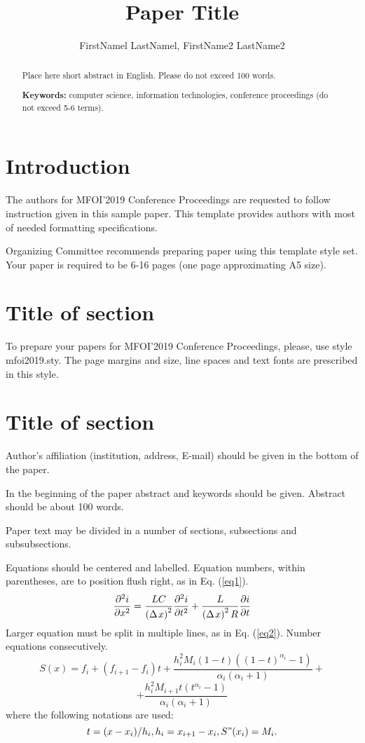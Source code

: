 \documentclass[11pt,twoside,a5paper]{article}
\title{Paper Title}
\author{FirstNamel LastNamel, FirstName2 LastName2}
\begin{document}
\maketitle

\begin{abstract}
Place here short abstract in English. Please do not exceed 100 words.

\textbf{Keywords:} computer science, information technologies, conference 
proceedings (do not exceed 5-6 terms).
\end{abstract}

\section{Introduction}
The authors for MFOI'2019 Conference Proceedings are requested to follow 
instruction given in this sample paper. This template provides authors with 
most of needed formatting specifications.

Organizing Committee recommends preparing paper using this template style 
set. Your paper is required to be 6-16 pages (one page approximating A5 size). 


\section{Title of section}
To prepare your papers for MFOI'2019 Conference Proceedings, please, use style mfoi2019.sty. The page margins and size, line spaces and text fonts are prescribed in this style.

\section{Title of section}
Author's affiliation (institution, address, E-mail) 
should be given in the bottom of the paper. 

In the beginning of the paper abstract and keywords should be given. 
Abstract should be about 100 words. 

Paper text may be divided in a number of sections, subsections and subsubsections. 

Equations should be centered and labelled. Equation numbers, within 
parentheses, are to position flush right, as in Eq. (\ref{eq1}).
\begin{equation}
\label{eq1}
\frac{\partial ^2i}{\partial x^2}=\frac{LC}{\left( {\Delta {\kern 1pt}x} 
\right)^2}\frac{\partial ^2i}{\partial t^2}+\frac{L}{\left( {\Delta {\kern 
1pt}x} \right)^2R}\frac{\partial i}{\partial t}
\end{equation}
Larger equation must be split in multiple lines, as in Eq. (\ref{eq2}). Number 
equations consecutively.
\[
S(x)=f_i +(f_{i+1} -f_i )t+\frac{h_i^2 M_i (1-t)((1-t)^{\alpha _i 
}-1)}{\alpha _i (\alpha _i +1)}+
\]
\begin{equation}
\label{eq2}
+\frac{h_i^2 M_{i+1} t(t^{\alpha _i }-1)}{\alpha _i (\alpha _i +1)}
\end{equation}
where the following notations are used:
\[
t=(x-x_i )/h_i ,h_i =x_{i+1} -x_i ,S"(x_i )=M_i .
\]
\end{document}
